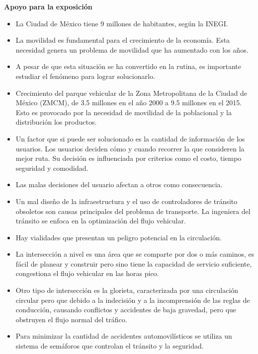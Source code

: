 \documentclass[12pt]{article}
\begin{document}
    \begin{center}
        \textbf{Apoyo para la exposición}
    \end{center}
    \begin{itemize}
        \item La Ciudad de México tiene 9 millones de habitantes, según la INEGI. 
        \item La movilidad es fundamental para el crecimiento de la economía. Esta necesidad genera un problema de movilidad que ha aumentado con los años.
        \item A pesar de que esta situación se ha convertido en la rutina, es importante estudiar el fenómeno para lograr solucionarlo.
        \item Crecimiento del parque vehicular de la Zona Metropolitana de la Ciudad de México (ZMCM), de 3.5 millones en el año 2000 a 9.5 millones en el 2015. Esto es provocado por la necesidad de movilidad de la poblacional y la distribución los productos.
        \item Un factor que si puede ser solucionado es la cantidad de información de los usuarios. Los usuarios deciden cómo y cuando recorrer la que consideren la mejor ruta. Su decisión es influenciada por criterios como el costo, tiempo seguridad y comodidad. 
        \item Las malas decisiones del usuario afectan a otros como consecuencia.
        \item Un mal diseño de la infraestructura y el uso de controladores de tránsito obsoletos son causas principales del problema de transporte. La ingeniera del tránsito se enfoca en la optimización del flujo vehicular.
        \item Hay vialidades que presentan un peligro potencial en la circulación.
        \item La intersección a nivel es una área que se comparte por dos o más caminos, es fácil de planear y construir pero sino tiene la capacidad de servicio suficiente, congestiona el flujo vehicular en las horas pico.
        \item Otro tipo de intersección es la glorieta, caracterizada por una circulación circular pero que debido a la indecisión y a la incomprensión de las reglas de conducción, causando conflictos y accidentes de baja gravedad, pero que obstruyen el flujo normal del tráfico.
        \item Para minimizar la cantidad de accidentes automovilísticos se utiliza un sistema de semáforos que controlan el tránsito y la seguridad.

\end{itemize}
\end{document}
